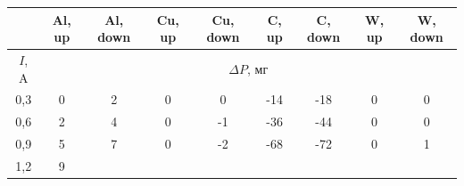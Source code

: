 \documentclass[a4paper,12pt]{article}
\begin{document}
\begin{table}[H]\label{tab: F ot I}
    \centering
    \begin{tabular}{|c|cccccccc|}
        \hline
        {\color[HTML]{000000} } &
          \multicolumn{1}{c|}{{\color[HTML]{000000} Al,  up}} &
          \multicolumn{1}{c|}{{\color[HTML]{000000} Al,  down}} &
          \multicolumn{1}{c|}{{\color[HTML]{000000} Cu,  up}} &
          \multicolumn{1}{c|}{{\color[HTML]{000000} Cu,  down}} &
          \multicolumn{1}{c|}{{\color[HTML]{000000} C,  up}} &
          \multicolumn{1}{c|}{{\color[HTML]{000000} C,  down}} &
          \multicolumn{1}{c|}{{\color[HTML]{000000} W,  up}} &
          {\color[HTML]{000000} W,  down} \\ \hline
        {\color[HTML]{000000} $I$, A} &
          \multicolumn{8}{c|}{{\color[HTML]{000000} $\Delta P$, мг}} \\ \hline
        {\color[HTML]{000000} 0,3} &
          \multicolumn{1}{c|}{{\color[HTML]{000000} 0}} &
          \multicolumn{1}{c|}{{\color[HTML]{000000} 2}} &
          \multicolumn{1}{c|}{{\color[HTML]{000000} 0}} &
          \multicolumn{1}{c|}{{\color[HTML]{000000} 0}} &
          \multicolumn{1}{c|}{{\color[HTML]{000000} -14}} &
          \multicolumn{1}{c|}{{\color[HTML]{000000} -18}} &
          \multicolumn{1}{c|}{{\color[HTML]{000000} 0}} &
          {\color[HTML]{000000} 0} \\ \hline
        {\color[HTML]{000000} 0,6} &
          \multicolumn{1}{c|}{{\color[HTML]{000000} 2}} &
          \multicolumn{1}{c|}{{\color[HTML]{000000} 4}} &
          \multicolumn{1}{c|}{{\color[HTML]{000000} 0}} &
          \multicolumn{1}{c|}{{\color[HTML]{000000} -1}} &
          \multicolumn{1}{c|}{{\color[HTML]{000000} -36}} &
          \multicolumn{1}{c|}{{\color[HTML]{000000} -44}} &
          \multicolumn{1}{c|}{{\color[HTML]{000000} 0}} &
          {\color[HTML]{000000} 0} \\ \hline
        {\color[HTML]{000000} 0,9} &
          \multicolumn{1}{c|}{{\color[HTML]{000000} 5}} &
          \multicolumn{1}{c|}{{\color[HTML]{000000} 7}} &
          \multicolumn{1}{c|}{{\color[HTML]{000000} 0}} &
          \multicolumn{1}{c|}{{\color[HTML]{000000} -2}} &
          \multicolumn{1}{c|}{{\color[HTML]{000000} -68}} &
          \multicolumn{1}{c|}{{\color[HTML]{000000} -72}} &
          \multicolumn{1}{c|}{{\color[HTML]{000000} 0}} &
          {\color[HTML]{000000} 1} \\ \hline
        {\color[HTML]{000000} 1,2} &
          \multicolumn{1}{c|}{{\color[HTML]{000000} 9}} &

\end{tabular}
\end{table}
\end{document}
